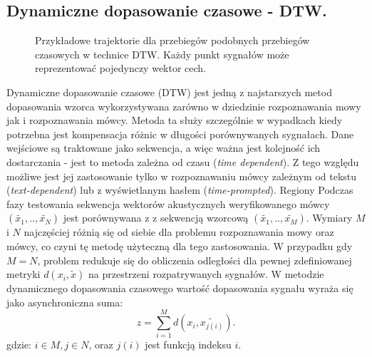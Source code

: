 \subsection{Dynamiczne dopasowanie czasowe - DTW.}

\begin{figure}
  \centering
    
    \caption{Przykładowe trajektorie  dla przebiegów podobnych przebiegów czasowych w technice DTW. Każdy punkt sygnałów może reprezentować pojedynczy wektor cech.}
    \label{dtw}
\end{figure}

Dynamiczne dopasowanie czasowe (DTW) jest jedną z najstarszych metod dopasowania wzorca \cite{multidsp} wykorzystywana zarówno w dziedzinie rozpoznawania mowy jak i rozpoznawania mówcy. Metoda ta służy szczególnie w wypadkach kiedy potrzebna jest kompensacja różnic w długości porównywanych sygnałach. Dane wejściowe są traktowane jako sekwencja, a więc ważna jest kolejność ich dostarczania - jest to metoda zależna od czasu (\textit{time dependent}). Z tego względu możliwe jest jej zastosowanie tylko w rozpoznawaniu mówcy zależnym od tekstu (\textit{text-dependent}) lub z wyświetlanym hasłem (\textit{time-prompted}). Regiony Podczas fazy testowania sekwencja wektorów akustycznych weryfikowanego mówcy $(\tilde{x_1},..,\tilde{x_N})$ jest porównywana z z sekwencją wzorcową $(\tilde{x_1},..,\tilde{x_M})$. Wymiary $M$ i $N$ najczęściej różnią się od siebie dla problemu rozpoznawania mowy oraz mówcy, co czyni tę metodę użyteczną dla tego zastosowania. W przypadku gdy $M=N$, problem redukuje się do obliczenia odległości dla pewnej zdefiniowanej metryki $d(x_i, \tilde{x})$ na przestrzeni rozpatrywanych sygnałów. W metodzie dynamicznego dopasowania czasowego wartość dopasowania sygnału wyraża się jako asynchroniczna suma:
\begin{equation}
  z = \sum_{i=1}^{M} d(x_i,\tilde{x_{j(i)}}).
  \label{z}
\end{equation}
gdzie: $i \in M, j \in N$, oraz $j(i)$ jest funkcją indeksu $i$.

